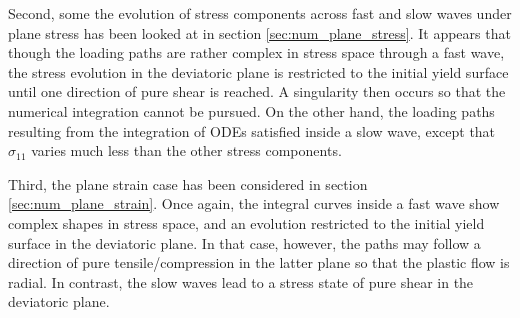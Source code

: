 Second, some the evolution of stress components across fast and slow waves under plane stress has been looked at in section \ref{sec:num_plane_stress}.
It appears that though the loading paths are rather complex in stress space through a fast wave, the stress evolution in the deviatoric plane is restricted to the initial yield surface until one direction of pure shear is reached.
A singularity then occurs so that the numerical integration cannot be pursued.
On the other hand, the loading paths resulting from the integration of ODEs satisfied inside a slow wave, except that $\sigma_{11}$ varies much less than the other stress components.

Third, the plane strain case has been considered in section \ref{sec:num_plane_strain}.
Once again, the integral curves inside a fast wave show complex shapes in stress space, and an evolution restricted to the initial yield surface in the deviatoric plane.
In that case, however, the paths may follow a direction of pure tensile/compression in the latter plane so that the plastic flow is radial. 
In contrast, the slow waves lead to a stress state of pure shear in the deviatoric plane.

